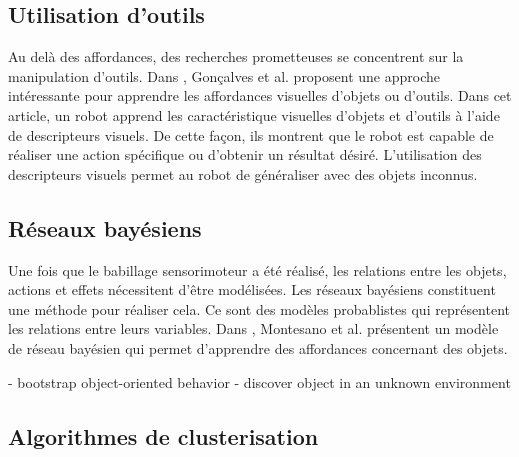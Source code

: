 \documentclass{llncs}
\begin{document}
\subsection{Utilisation d'outils}
Au delà des affordances, des recherches prometteuses se concentrent sur la manipulation d'outils. Dans \cite{Goncalves2014}, Gonçalves et al. proposent une approche intéressante pour apprendre les affordances visuelles d'objets ou d'outils. Dans cet article, un robot apprend les caractéristique visuelles d'objets et d'outils à l'aide de descripteurs visuels. De cette façon, ils montrent que le robot est capable de réaliser une action spécifique ou d'obtenir un résultat désiré. L'utilisation des descripteurs visuels permet au robot de généraliser avec des objets inconnus.


\subsection{Réseaux bayésiens}
Une fois que le babillage sensorimoteur a été réalisé, les relations entre les objets, actions et effets nécessitent d'être modélisées. Les réseaux bayésiens constituent une méthode pour réaliser cela. Ce sont des modèles probablistes qui représentent les relations entre leurs variables. Dans \cite{4456755}, Montesano et al. présentent un modèle de réseau bayésien qui permet d'apprendre des affordances concernant des objets.


- bootstrap object-oriented behavior
- discover object in an unknown environment


\subsection{Algorithmes de clusterisation}
\end{document}
